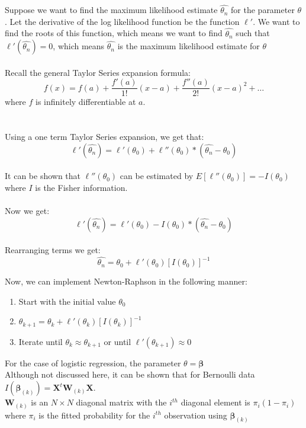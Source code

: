 \documentclass[12pt,timesnewroman,letterpaper]{article}
\begin{document}
\noindent Suppose we want to find the maximum likelihood estimate $\hat{\theta_n}$ for the parameter $\theta$. Let the derivative of the log likelihood function be the function $\ell'$. We want to find the roots of this function, which means we want to find $\hat{\theta_n}$ such that $\ell'(\hat{\theta_n}) = 0$, which means $\hat{\theta_n}$ is the maximum likelihood estimate for $\theta$
\\\\
Recall the general Taylor Series expansion formula:
$$
f(x) = f(a) + \dfrac{f'(a)}{1!}(x - a) + \dfrac{f''(a)}{2!}(x-a)^2 + \ldots
$$
where $f$ is infinitely differentiable at $a$.
\\\\\\
Using a one term Taylor Series expansion, we get that:
$$
\ell'(\hat{\theta_n}) = \ell'(\theta_0) + \ell''(\theta_0)*(\hat{\theta_n} - \theta_0)
$$
\\
It can be shown that $\ell''(\theta_0)$ can be estimated by $E[\ell''(\theta_0)] = -I(\theta_0)$ where $I$ is the Fisher information. \\\\

Now we get:
$$
\ell'(\hat{\theta_n}) = \ell'(\theta_0) - I(\theta_0)*(\hat{\theta_n} - \theta_0)
$$
\\
Rearranging terms we get:
$$
\hat{\theta_n} = \theta_0 + \ell'(\theta_0)[I(\theta_0)]^{-1}
$$

\noindent Now, we can implement Newton-Raphson in the following manner:

\begin{enumerate}
    \item Start with the initial value $\theta_0$
    \item $\theta_{k+1} = \theta_k + \ell'(\theta_k)[I(\theta_k)]^{-1}$
    \item Iterate until $\theta_k \approx \theta_{k+1}$ or until $\ell'(\theta_{k+1}) \approx 0$
\end{enumerate}

\noindent For the case of logistic regression, the parameter $\theta = \boldsymbol{\beta}$\\

\noindent Although not discussed here, it can be shown that for Bernoulli data $I(\boldsymbol{\beta}_{(k)}) = \boldsymbol{X}^t \boldsymbol{W}_{(k)} \boldsymbol{X}$.\\

\noindent $\boldsymbol{W}_{(k)}$ is an $N \times N$ diagonal matrix with the $i^{th}$ diagonal element is $\pi_i(1-\pi_i)$ where $\pi_i$ is the fitted probability for the $i^{th}$ observation using $\boldsymbol{\beta}_{(k)}$\\
\end{document}
